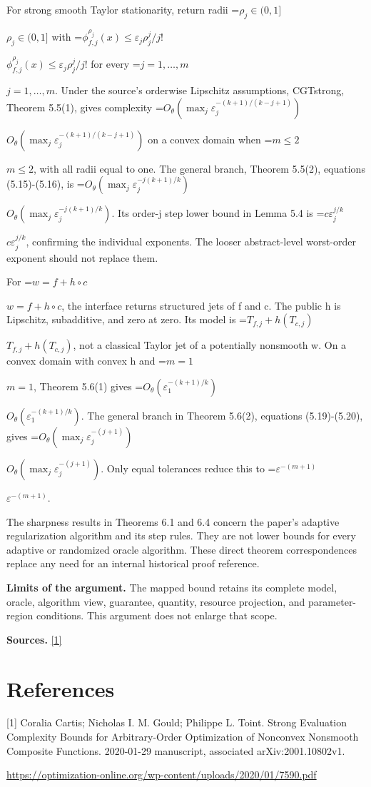 \documentclass[10pt,a4paper]{article}
\newcommand{\AtlasMath}[1]{\par\begingroup\centering\setbox0=\hbox{$\displaystyle #1$}\ifdim\wd0>1.4\linewidth\typeout{ATLAS WIDE FORMULA: \the\wd0}\fi\ifdim\wd0>\linewidth\resizebox{\linewidth}{!}{\box0}\else\box0\fi\par\endgroup}
\newcommand{\AtlasInlineMath}[1]{\begingroup\setbox0=\hbox{$#1$}\ifdim\wd0>.4\linewidth\endgroup\AtlasMath{#1}\else\endgroup$#1$\fi}
\begin{document}
For strong smooth Taylor stationarity, return radii \AtlasInlineMath{\rho_j\in(0,1]} with \AtlasInlineMath{\phi_{f,j}^{\rho_j}(x)\le\varepsilon_j\rho_j^j/j!} for every \AtlasInlineMath{j=1,\ldots,m}. Under the source's orderwise Lipschitz assumptions, CGTstrong, Theorem 5.5(1), gives complexity \AtlasInlineMath{O_\theta(\max_j\varepsilon_j^{-(k+1)/(k-j+1)})} on a convex domain when \AtlasInlineMath{m\le2}, with all radii equal to one. The general branch, Theorem 5.5(2), equations (5.15)-(5.16), is \AtlasInlineMath{O_\theta(\max_j\varepsilon_j^{-j(k+1)/k})}. Its order-j step lower bound in Lemma 5.4 is \AtlasInlineMath{c\varepsilon_j^{j/k}}, confirming the individual exponents. The looser abstract-level worst-order exponent should not replace them.

For \AtlasInlineMath{w=f+h\circ c}, the interface returns structured jets of f and c. The public h is Lipschitz, subadditive, and zero at zero. Its model is \AtlasInlineMath{T_{f,j}+h(T_{c,j})}, not a classical Taylor jet of a potentially nonsmooth w. On a convex domain with convex h and \AtlasInlineMath{m=1}, Theorem 5.6(1) gives \AtlasInlineMath{O_{\theta}(\varepsilon_1^{-(k+1)/k})}. The general branch in Theorem 5.6(2), equations (5.19)-(5.20), gives \AtlasInlineMath{O_\theta(\max_j\varepsilon_j^{-(j+1)})}. Only equal tolerances reduce this to \AtlasInlineMath{\varepsilon^{-(m+1)}}.

The sharpness results in Theorems 6.1 and 6.4 concern the paper's adaptive regularization algorithm and its step rules. They are not lower bounds for every adaptive or randomized oracle algorithm. These direct theorem correspondences replace any need for an internal historical proof reference.

\textbf{Limits of the argument.} The mapped bound retains its complete model, oracle, algorithm view, guarantee, quantity, resource projection, and parameter-region conditions. This argument does not enlarge that scope.

\textbf{Sources.} \href{https://optimization-online.org/wp-content/uploads/2020/01/7590.pdf}{[1]}

\section{References}
[1] Coralia Cartis; Nicholas I. M. Gould; Philippe L. Toint. Strong Evaluation Complexity Bounds for Arbitrary-Order Optimization of Nonconvex Nonsmooth Composite Functions. 2020-01-29 manuscript, associated arXiv:2001.10802v1.

\url{https://optimization-online.org/wp-content/uploads/2020/01/7590.pdf}
\end{document}
